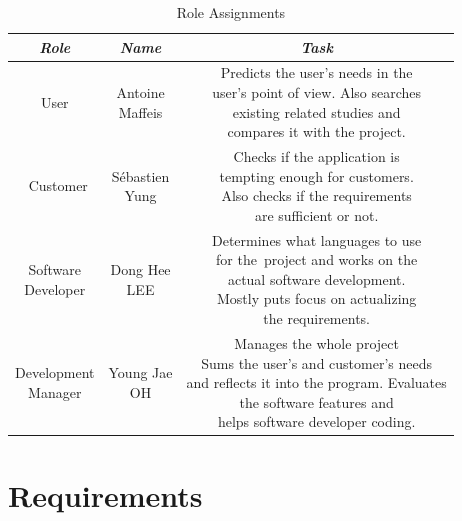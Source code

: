 \documentclass[conference]{IEEEtran}
\begin{document}
\begin{table}[htbp]
\caption{Role Assignments}
\begin{center}
\begin{tabular}{ | c | c | c | } 
\hline
\textbf{\textit{Role}}& \textbf{\textit{Name}}& \textbf{\textit{Task}} \\
\hline
User& \makecell{Antoine\\Maffeis}& \makecell{Predicts the user’s needs in the\\ user’s point of view. Also searches\\existing related studies and\\compares it with the project.}   \\
\hline\
Customer& \makecell{Sébastien\\Yung}& \makecell{Checks if the application is\\ tempting enough for customers.\\
Also checks if the requirements\\are sufficient or not.}\\
\hline
\makecell{Software\\Developer}& \makecell{Dong Hee\\LEE}& \makecell{Determines what languages to use\\for the\ project and works on the\\actual software development.\\ Mostly puts focus on actualizing\\the requirements.}   \\
\hline
\makecell{Development\\Manager}& \makecell{Young Jae\\OH}& \makecell{Manages the whole project\\Sums the user’s and customer’s needs\\and reflects it into the program. Evaluates\\the software features and\\helps software developer coding.}\\
\hline
\end{tabular}
\label{tab1}
\end{center}
\end{table}

\section{Requirements}
\end{document}

